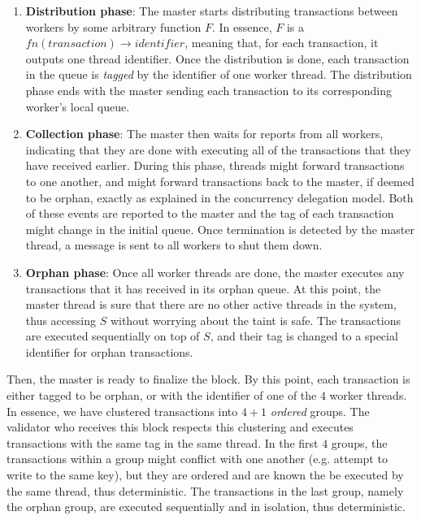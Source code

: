 \begin{enumerate}
    \item \textbf{Distribution phase}: The master starts distributing transactions between workers
    by some arbitrary function $F$. In essence, $F$ is a $fn(transaction) \rightarrow identifier$,
    meaning that, for each transaction, it outputs one thread identifier. Once the distribution is
    done, each transaction in the queue is \textit{tagged} by the identifier of one worker thread.
    The distribution phase ends with the master sending each transaction to its corresponding
    worker's local queue.

    \item \textbf{Collection phase}: The master then waits for reports from all workers, indicating
    that they are done with executing all of the transactions that they have received earlier.
    During this phase, threads might forward transactions to one another, and might forward
    transactions back to the master, if deemed to be orphan, exactly as explained in the concurrency
    delegation model. Both of these events are reported to the master and the tag of each
    transaction might change in the initial queue. Once termination is detected by the master
    thread, a message is sent to all workers to shut them down.

    \item \textbf{Orphan phase}: Once all worker threads are done, the master executes any
    transactions that it has received in its orphan queue. At this point, the master thread is sure
    that there are no other active threads in the system, thus accessing $S$ without worrying about
    the taint is safe. The transactions are executed sequentially on top of $S$, and their tag is
    changed to a special identifier for orphan transactions.
\end{enumerate}

Then, the master is ready to finalize the block. By this point, each transaction is either tagged to
be orphan, or with the identifier of one of the $4$ worker threads. In essence, we have clustered
transactions into $4 + 1$ \textit{ordered} groups. The validator who receives this block respects
this clustering and executes transactions with the same tag in the same thread. In the first $4$
groups, the transactions within a group might conflict with one another (e.g. attempt to write to
the same key), but they are ordered and are known the be executed by the same thread, thus
deterministic. The transactions in the last group, namely the orphan group, are executed
sequentially and in isolation, thus deterministic.


